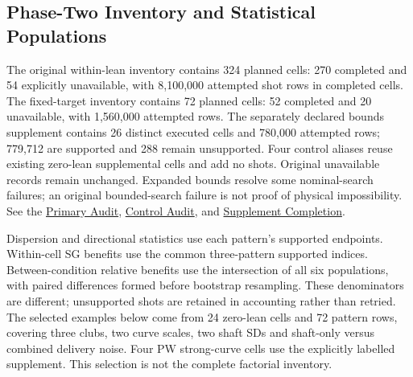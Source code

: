 \documentclass[11pt,letterpaper]{article}
\begin{document}
\subsection{Phase-Two Inventory and Statistical Populations}
The original within-lean inventory contains 324 planned cells: 270 completed
and 54 explicitly unavailable, with 8,100,000 attempted shot rows in completed
cells. The fixed-target inventory contains 72 planned cells: 52 completed and
20 unavailable, with 1,560,000 attempted rows. The separately declared bounds
supplement contains 26 distinct executed cells and 780,000 attempted rows;
779,712 are supported and 288 remain unsupported. Four control aliases reuse
existing zero-lean supplemental cells and add no shots. Original unavailable
records remain unchanged. Expanded bounds resolve some nominal-search failures;
an original bounded-search failure is not proof of physical impossibility.
See the \href{phase2/validation/independent_primary_final_audit.json}{Primary Audit},
\href{phase2/validation/independent_control_final_audit.json}{Control Audit}, and
\href{phase2/validation/supplement_final_completion.json}{Supplement Completion}.

Dispersion and directional statistics use each pattern's supported endpoints.
Within-cell SG benefits use the common three-pattern supported indices.
Between-condition relative benefits use the intersection of all six populations,
with paired differences formed before bootstrap resampling. These denominators
are different; unsupported shots are retained in accounting rather than retried.
The selected examples below come from 24 zero-lean cells and 72 pattern rows,
covering three clubs, two curve scales, two shaft SDs and shaft-only versus
combined delivery noise. Four PW strong-curve cells use the explicitly labelled
supplement. This selection is not the complete factorial inventory.
\end{document}
